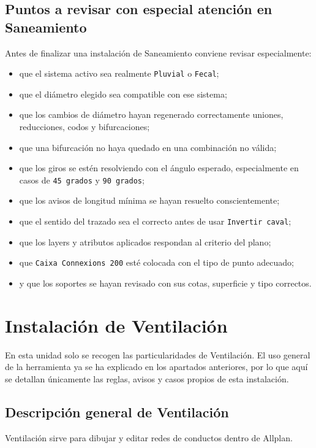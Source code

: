 \documentclass[12pt,a4paper]{article}
\begin{document}
\subsection{Puntos a revisar con especial atención en Saneamiento}

Antes de finalizar una instalación de Saneamiento conviene revisar especialmente:

\begin{itemize}
\item que el sistema activo sea realmente \texttt{Pluvial} o \texttt{Fecal};
\item que el diámetro elegido sea compatible con ese sistema;
\item que los cambios de diámetro hayan regenerado correctamente uniones, reducciones, codos y bifurcaciones;
\item que una bifurcación no haya quedado en una combinación no válida;
\item que los giros se estén resolviendo con el ángulo esperado, especialmente en casos de \texttt{45 grados} y \texttt{90 grados};
\item que los avisos de longitud mínima se hayan resuelto conscientemente;
\item que el sentido del trazado sea el correcto antes de usar \texttt{Invertir caval};
\item que los layers y atributos aplicados respondan al criterio del plano;
\item que \texttt{Caixa Connexions 200} esté colocada con el tipo de punto adecuado;
\item y que los soportes se hayan revisado con sus cotas, superficie y tipo correctos.
\end{itemize}

\section{Instalación de Ventilación}

En esta unidad solo se recogen las particularidades de Ventilación. El uso general de la herramienta ya se ha explicado en los apartados anteriores, por lo que aquí se detallan únicamente las reglas, avisos y casos propios de esta instalación.

\subsection{Descripción general de Ventilación}

Ventilación sirve para dibujar y editar redes de conductos dentro de Allplan.
\end{document}
